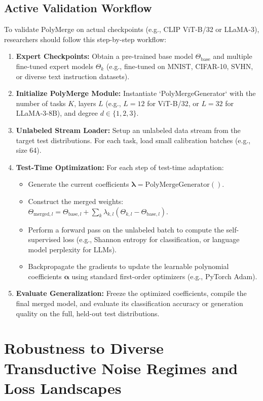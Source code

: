 \subsection{Active Validation Workflow}
To validate PolyMerge on actual checkpoints (e.g., CLIP ViT-B/32 or LLaMA-3), researchers should follow this step-by-step workflow:
\begin{enumerate}
    \item \textbf{Expert Checkpoints:} Obtain a pre-trained base model $\Theta_{\text{base}}$ and multiple fine-tuned expert models $\Theta_k$ (e.g., fine-tuned on MNIST, CIFAR-10, SVHN, or diverse text instruction datasets).
    \item \textbf{Initialize PolyMerge Module:} Instantiate `PolyMergeGenerator` with the number of tasks $K$, layers $L$ (e.g., $L=12$ for ViT-B/32, or $L=32$ for LLaMA-3-8B), and degree $d \in \{1, 2, 3\}$.
    \item \textbf{Unlabeled Stream Loader:} Setup an unlabeled data stream from the target test distributions. For each task, load small calibration batches (e.g., size 64).
    \item \textbf{Test-Time Optimization:} For each step of test-time adaptation:
    \begin{itemize}
        \item Generate the current coefficients $\boldsymbol{\lambda} = \text{PolyMergeGenerator}()$.
        \item Construct the merged weights: $\Theta_{\text{merged}, l} = \Theta_{\text{base}, l} + \sum_{k} \lambda_{k, l} (\Theta_{k, l} - \Theta_{\text{base}, l})$.
        \item Perform a forward pass on the unlabeled batch to compute the self-supervised loss (e.g., Shannon entropy for classification, or language model perplexity for LLMs).
        \item Backpropagate the gradients to update the learnable polynomial coefficients $\boldsymbol{\alpha}$ using standard first-order optimizers (e.g., PyTorch Adam).
    \end{itemize}
    \item \textbf{Evaluate Generalization:} Freeze the optimized coefficients, compile the final merged model, and evaluate its classification accuracy or generation quality on the full, held-out test distributions.
\end{enumerate}


\section{Robustness to Diverse Transductive Noise Regimes and Loss Landscapes}
\label{sec:appendix_robustness}

